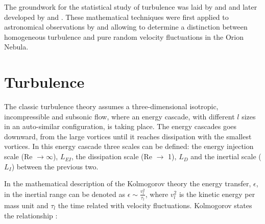 

The groundwork for the statistical study of turbulence was laid by \citet{taylor1935i,taylor1935ii} and \citet{karman1937statistical} and later developed by \citet{kolm1,kolm2} and \citet{heisenberg1951stability}. 
These mathematical techniques were first applied to astronomical observations by \citet{von1951methode} and \citet{munch1958internal} allowing to determine a distinction between homogeneous turbulence and pure random velocity fluctuations in the Orion Nebula. 

\section{Turbulence}\label{sec:turb}

The classic turbulence theory \citep{kolm1} assumes a three-dimensional isotropic, incompressible and subsonic flow, where an energy cascade, with different $l$ sizes in an auto-similar configuration, is taking place. 
The energy cascades goes downward, from the large vortices until it reaches dissipation with the smallest vortices.
In this energy cascade three scales can be defined: the energy injection scale (Re $\rightarrow \infty$), $L_{EI}$, the dissipation scale (Re $\rightarrow$ 1), $L_{D}$ and the inertial scale ($L_{I}$) between the previous two. 

In the mathematical description of the Kolmogorov theory the energy transfer, $\epsilon$, in the inertial range can be denoted as $\epsilon \sim \frac{v_{l}^{2}}{\tau_{l}}$, where $v_{l}^{2}$ is the kinetic energy per mass unit and $\tau_{l}$ the time related with velocity fluctuations. 
Kolmogorov states the relationship \citep{Leqism}:

